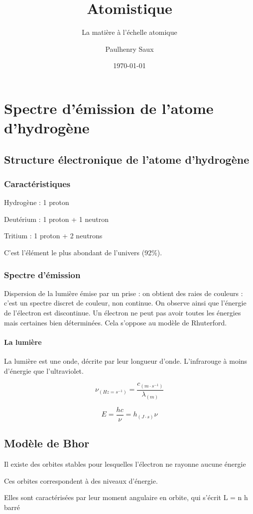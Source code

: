 \documentclass[french]{yLectureNote}
\title{Atomistique}
\subtitle{La matière à l'échelle atomique}
\author{Paulhenry Saux}
\date{\today}
\begin{document}
\setcounter{chapter}{1}

	\chapter{Spectre d'émission de l'atome d'hydrogène}

\section{Structure électronique de l'atome d'hydrogène}
\subsection{Caractéristiques}
Hydrogène : 1 proton

Deutérium : 1 proton + 1 neutron

Tritium : 1 proton + 2 neutrons

C'est l'élément le plus abondant de l'univers (92\%).
\subsection{Spectre d'émission}
Dispersion de la lumière émise par un prise : on obtient des raies de couleurs : c'est un spectre discret de couleur, non continue. On observe ainsi que l'énergie de l'électron est discontinue. Un électron ne peut pas avoir toutes les énergies mais certaines bien déterminées. Cela s'oppose au modèle de Rhuterford.
\subsubsection{La lumière}
La lumière est une onde, décrite par leur longueur d'onde. L'infrarouge à moins d'énergie que l'ultraviolet.
\begin{theorem}[Fréquence]
\[\nu_{(Hz = s^{-1})} = \frac{c_{(m\cdot s^{-1})}}{\lambda_{(m)}}\]
\end{theorem}

\begin{theorem}
\[E = \frac{hc}{\nu} = h_{(J\cdot s)}\nu\]
\end{theorem}
\section{Modèle de Bhor}
Il existe des orbites stables pour lesquelles l'électron ne rayonne aucune énergie

Ces orbites correspondent à des niveaux d'énergie.

Elles sont caractérisées par leur moment angulaire en orbite, qui s'écrit L = n h barré
\end{document}
